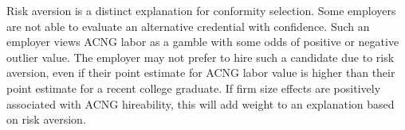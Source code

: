 \documentclass[review]{elsarticle}
\begin{document}
Risk aversion is a distinct explanation for conformity selection.
Some employers are not able to evaluate an alternative credential with confidence.
Such an employer views ACNG labor as a gamble with some odds of positive or negative outlier value.
The employer may not prefer to hire such a candidate due to risk aversion,
even if their point estimate for ACNG labor value is higher than their point estimate for a recent college graduate.
If firm size effects are positively associated with ACNG hireability, this will add weight to an explanation based on risk aversion.
\end{document}

